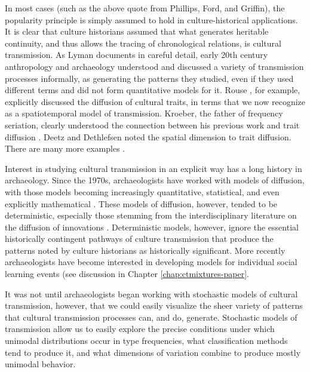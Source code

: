 In most cases (such as the above quote from Phillips, Ford, and
Griffin), the popularity principle is simply assumed to hold in
culture-historical applications. It is clear that culture historians
assumed that what generates heritable continuity, and thus allows the
tracing of chronological relations, is cultural transmission. As Lyman
\citeyearpar{lyman2008cultural} documents in careful detail, early 20th century
anthropology and archaeology understood and discussed a variety of
transmission processes informally, as generating the patterns they
studied, even if they used different terms and did not form quantitative
models for it. Rouse \citeyearpar{Rouse1939}, for example, explicitly
discussed the diffusion of cultural traits, in terms that we now
recognize as a spatiotemporal model of transmission. Kroeber, the father
of frequency seriation, clearly understood the connection between his
previous work and trait diffusion \citep{kroeber1937diffusion}. Deetz
and Dethlefsen \citetext{\citeyear{Deetz1965a}; \citeyear{Deetz1971}}
noted the spatial dimension to trait diffusion. There are many more
examples \citep{lyman2008cultural}.

Interest in studying cultural transmission in an explicit way has a long
history in archaeology. Since the 1970s, archaeologists have worked with
models of diffusion, with those models becoming increasingly
quantitative, statistical, and even explicitly mathematical
\citep[e.g.,][]{ammerman1971measuring}. These models of diffusion,
however, tended to be deterministic, especially those stemming from the
interdisciplinary literature on the diffusion of innovations
\citep[e.g.,][]{Rogers2003}. Deterministic models, however, ignore the
essential historically contingent pathways of culture transmission that
produce the patterns noted by culture historians as historically
significant. More recently archaeologists have become interested in
developing models for individual social learning events (see discussion in Chapter \ref{chap:ctmixtures-paper}. 

It was not until archaeologists began working with stochastic models of
cultural transmission, however, that we could easily visualize the sheer
variety of patterns that cultural transmission processes can, and do,
generate. Stochastic models of transmission allow us to easily explore
the precise conditions under which unimodal distributions occur in type
frequencies, what classification methods tend to produce it, and what
dimensions of variation combine to produce mostly unimodal behavior.

